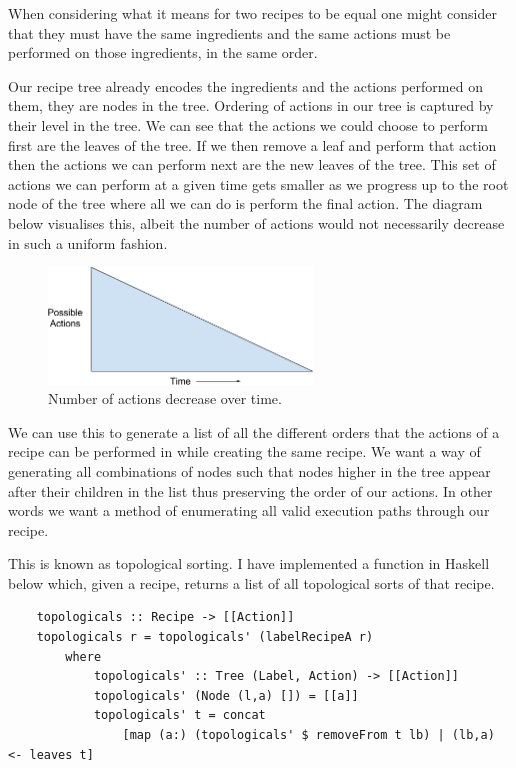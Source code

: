 \documentclass[11pt]{article}
\begin{document}
When considering what it means for two recipes to be equal one
might consider that they must have the same ingredients
and the same actions must be performed on those ingredients,
in the same order.

\medbreak

Our recipe tree already encodes the ingredients and the actions
performed on them, they are nodes in the tree. Ordering of
actions in our tree is captured by their level in the tree.
We can see that the actions we could choose to perform first
are the leaves of the tree. If we then remove a leaf and perform
that action then the actions we can perform next are the new
leaves of the tree. This set of actions we can perform at a given time
gets smaller as we progress up to the root node of the tree where all
we can do is perform the final action. The diagram below visualises
this, albeit the number of actions would not necessarily decrease
in such a uniform fashion.

\begin{figure}[h]
\includegraphics[width=7cm, keepaspectratio]{actionsOverTime.png}
\centering
\caption{Number of actions decrease over time.}
\end{figure}

We can use this to generate a list of all
the different orders that the actions of a recipe can be performed
in while creating the same recipe. We want a way of generating
all combinations of nodes such that nodes higher in the tree
appear after their children in the list thus preserving the
order of our actions. In other words we want a method of enumerating
all valid execution paths through our recipe.

\medbreak

This is known as topological sorting. I have implemented a
function in Haskell below which, given a recipe, returns a list
of all topological sorts of that recipe.

\begin{lstlisting}
    topologicals :: Recipe -> [[Action]]
    topologicals r = topologicals' (labelRecipeA r)
        where
            topologicals' :: Tree (Label, Action) -> [[Action]]
            topologicals' (Node (l,a) []) = [[a]]
            topologicals' t = concat
                [map (a:) (topologicals' $ removeFrom t lb) | (lb,a) <- leaves t]
\end{lstlisting}
\end{document}
